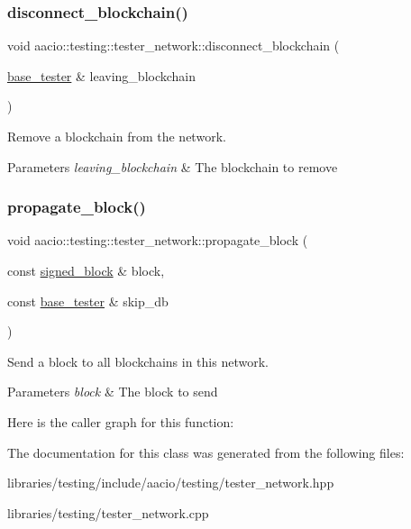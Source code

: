 \subsubsection{\texorpdfstring{disconnect\+\_\+blockchain()}{disconnect\_blockchain()}}
{\footnotesize\ttfamily void aacio\+::testing\+::tester\+\_\+network\+::disconnect\+\_\+blockchain (\begin{DoxyParamCaption}\item[{\mbox{\hyperlink{classaacio_1_1testing_1_1base__tester}{base\+\_\+tester}} \&}]{leaving\+\_\+blockchain }\end{DoxyParamCaption})}



Remove a blockchain from the network. 


\begin{DoxyParams}{Parameters}
{\em leaving\+\_\+blockchain} & The blockchain to remove \\
\hline
\end{DoxyParams}
\mbox{\label{classaacio_1_1testing_1_1tester__network_a8d068f63852dc37eb30ae8fd9ce59550}} 
\subsubsection{\texorpdfstring{propagate\+\_\+block()}{propagate\_block()}}
{\footnotesize\ttfamily void aacio\+::testing\+::tester\+\_\+network\+::propagate\+\_\+block (\begin{DoxyParamCaption}\item[{const \mbox{\hyperlink{structaacio_1_1chain_1_1signed__block}{signed\+\_\+block}} \&}]{block,  }\item[{const \mbox{\hyperlink{classaacio_1_1testing_1_1base__tester}{base\+\_\+tester}} \&}]{skip\+\_\+db }\end{DoxyParamCaption})}



Send a block to all blockchains in this network. 


\begin{DoxyParams}{Parameters}
{\em block} & The block to send \\
\hline
\end{DoxyParams}
Here is the caller graph for this function\+:


The documentation for this class was generated from the following files\+:\begin{DoxyCompactItemize}
\item 
libraries/testing/include/aacio/testing/tester\+\_\+network.\+hpp\item 
libraries/testing/tester\+\_\+network.\+cpp\end{DoxyCompactItemize}
